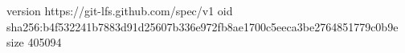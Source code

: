 version https://git-lfs.github.com/spec/v1
oid sha256:b4f532241b7883d91d25607b336e972fb8ae1700c5eeca3be2764851779c0b9e
size 405094
